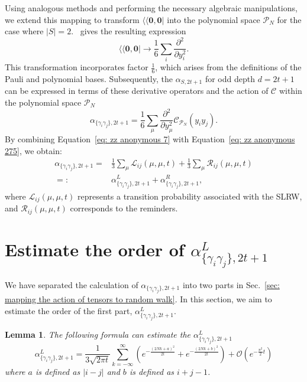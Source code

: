 \documentclass[showpacs,onecolumn,aps,prx,long bibliography,superscriptaddress,notitlepage]{revtex4-1}
\newtheorem{lemma}{Lemma}
\newcommand{\alpl}{\alpha_{\{\gamma_i\gamma_j\}, 2t+1}^{L}}
\newcommand{\supbra}[1]{\langle\langle #1 |}
\begin{document}
Using analogous methods and performing the necessary algebraic manipulations, we extend this mapping to transform \(\supbra{\bm{0}, \bm{0}}\) into the polynomial space \(\mathcal{P}_N\) for the case where \(|S| = 2\). \ gives the resulting expression \begin{equation}
    \supbra{\bm 0,\bm 0} \to \frac{1}{6} \sum_{i} \frac{\partial^2}{\partial y_i^2 }.
\end{equation}
This transformation incorporates factor \(\frac{1}{6}\), which arises from the definitions of the Pauli and polynomial bases. Subsequently, the \(\alpha_{S,2t+1}\) for odd depth \(d = 2t + 1\) can be expressed in terms of these derivative operators and the action of \(\mathcal{C}\) within the polynomial space \(\mathcal{P}_N\)
\begin{equation}
    \alpha_{\{\gamma_i\gamma_j\},2t+1} = \frac{1}{6} \sum_{\mu} \frac{\partial^2}{\partial y_\mu^2 } \mathcal{C}_{\mathcal{P}_N} (y_i y_j).
    \label{eq: zz anonymous 275}
\end{equation}
By combining Equation~\eqref{eq: zz anonymous 7} with Equation~\eqref{eq: zz anonymous 275}, we obtain:
\begin{align}
    \alpha_{\{\gamma_i\gamma_j\},2t+1} =& \frac{1}{3} \sum_\mu \mathscr{L}_{ij} (\mu, \mu, t) + \frac{1}{3} \sum_\mu \mathscr{R}_{ij} (\mu, \mu, t) \\
    =:&  \alpha_{\{\gamma_i\gamma_j\}, 2t+1}^{L} + \alpha_{\{\gamma_i\gamma_j\}, 2t+1}^{R},
    \label{eq: zz anonymous 24}
\end{align}
where \(\mathscr{L}_{ij} (\mu, \mu, t)\) represents a transition probability associated with the SLRW, and \(\mathscr{R}_{ij} (\mu, \mu, t)\) corresponds to the reminders. 

\section{Estimate the order of $\alpha_{\{\gamma_i\gamma_j\}, 2t+1}^{L}$}
\label{sec: estimate the order of alpl}
We have separated the calculation of $\alpha_{\{\gamma_i\gamma_j\},2t+1}$ into two parts in Sec.~\ref{sec: mapping the action of tensors to random walk}. In this section, we aim to estimate the order of the first part, $\alpl$.
\begin{lemma}
\label{theorem: order of alpha l}
    The following formula can estimate the $\alpl$
    \begin{equation}
        \alpl  = \frac{1}{3\sqrt{2\pi t}}  \sum_{k=-\infty}^{\infty} \left(e^{-\frac{(2Nk+a)^2}{2t}} + e^{-\frac{(2Nk+b)^2}{2t}} \right)+\mathcal{O}\left(e^{-\frac{\pi^2}{2}t}\right)
    \end{equation}
    where $a$ is defined as $|i-j|$ and $b$ is defined as $i+j-1$.
\end{lemma}
\end{document}

